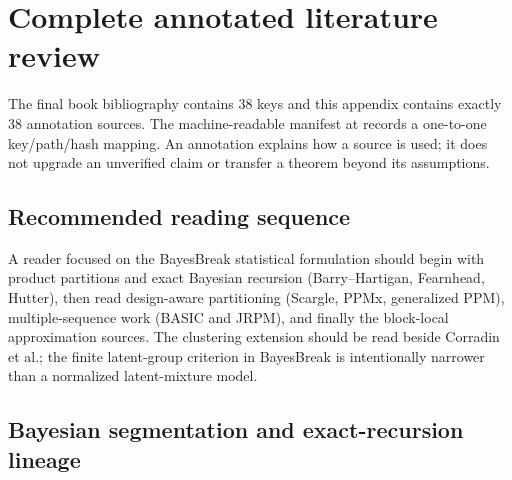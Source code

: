 
\chapter{Complete annotated literature review}
\label{app:annotated-literature}\label{app:annotated-lit}

\begin{statusbox}
The final book bibliography contains 38 keys and this appendix contains exactly 38 annotation
sources. The machine-readable manifest at
 records a one-to-one key/path/hash mapping.
An annotation explains how a source is used; it does not upgrade an unverified claim or transfer a
theorem beyond its assumptions.
\end{statusbox}

\section{Recommended reading sequence}
A reader focused on the BayesBreak statistical formulation should begin with product partitions and exact
Bayesian recursion (Barry--Hartigan, Fearnhead, Hutter), then read design-aware partitioning
(Scargle, PPMx, generalized PPM), multiple-sequence work (BASIC and JRPM), and finally the
block-local approximation sources. The clustering extension should be read beside Corradin et al.;
the finite latent-group criterion in BayesBreak is intentionally narrower than a normalized latent-mixture model.
\section{Bayesian segmentation and exact-recursion lineage}












